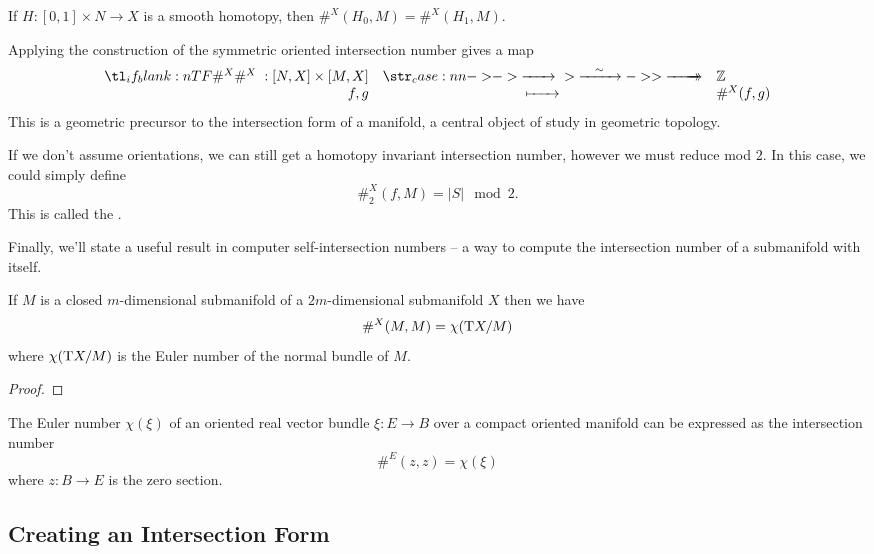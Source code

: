 \begin{corollary}
	If $H : [0,1]\times N \to X$ is a smooth homotopy, then $\#^X(H_0, M) = \#^X(H_1, M)$.
\end{corollary}

Applying the construction of the symmetric oriented intersection number gives a map
\begin{equation}\label{eq:oriented-intersection-number-homotopy}
	\lkxfunc{\#^X}{[N,X]\times [M,X]}{\Z}{f,g}{\#^X(f,g)}
\end{equation}
This is a geometric precursor to the intersection form of a manifold, a central object of study in geometric topology.

\begin{remark}
	If we don't assume orientations, we can still get a homotopy invariant intersection number, however we must reduce mod $2$. In this case, we could simply define 
	\[
		\#_2^X(f,M) = |S|\mod 2.
	\]
	This is called the .
\end{remark}

Finally, we'll state a useful result in computer self-intersection numbers -- a way to compute the intersection number of a submanifold with itself.

\begin{theorem}\label{thm:euler-number-self-intersection}
	If $M$ is a closed $m$-dimensional submanifold of a $2m$-dimensional submanifold $X$ then we have
	\[
		\#^X(M, M) = \chi(\operatorname{T\!} X/M)
	\]
	where $\chi(\operatorname{T\!} X/M)$ is the Euler number of the normal bundle of $M$.
\end{theorem}
\begin{proof}
\end{proof}

\begin{corollary}\label{thm:euler-number-self-intersection-corollary}
	The Euler number $\chi(\xi)$ of an oriented real vector bundle $\xi : E \to B$ over a compact oriented manifold can be expressed as the intersection number
	\[
		\#^E(z,z) = \chi(\xi)
	\]
	where $z : B \to E$ is the zero section.
\end{corollary}


\subsection{Creating an Intersection Form}

